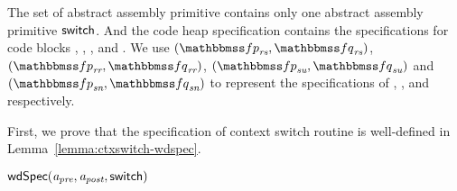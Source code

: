The set of abstract assembly primitive contains only 
one abstract assembly primitive $\mathsf{switch}$. And the 
code heap specification contains the specifications 
for code blocks \SwitchEntry{}, \regsave{}, \regrestore{}, 
\SaveUsedWin{} and \SwitchNewTask{}. We use 
$(\relspecpre_{\textit{rs}}, \relspecpost_{\textit{rs}})$, 
$(\relspecpre_{\textit{rr}}, \relspecpost_{\textit{rr}})$, 
$(\relspecpre_{\textit{su}}, \relspecpost_{\textit{su}})$ and
$(\relspecpre_{\textit{sn}}, \relspecpost_{\textit{sn}})$ to 
represent the specifications of 
\regsave{}, \regrestore{}, 
\SaveUsedWin{} and \SwitchNewTask{} respectively. 

First, we prove that the specification of 
context switch routine is well-defined in 
Lemma~\ref{lemma:ctxswitch-wdspec}.
\begin{lemma}
    \em
    \label{lemma:ctxswitch-wdspec}
    $\textsf{wdSpec}({\textit{a}_\textit{pre}}, {\textit{a}_\textit{post}}, {\mathsf{switch}})$
\end{lemma}
